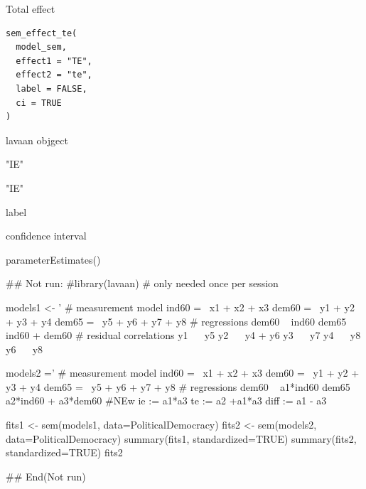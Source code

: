 \documentclass[a4paper]{book}
\begin{document}
%
\begin{Description}
Total effect
\end{Description}
%
\begin{Usage}
\begin{verbatim}
sem_effect_te(
  model_sem,
  effect1 = "TE",
  effect2 = "te",
  label = FALSE,
  ci = TRUE
)
\end{verbatim}
\end{Usage}
%
\begin{Arguments}
\begin{ldescription}
\item[\code{model\_sem}] lavaan objgect

\item[\code{effect1}] "IE"

\item[\code{effect2}] "IE"

\item[\code{label}] label

\item[\code{ci}] confidence interval
\end{ldescription}
\end{Arguments}
%
\begin{Value}
parameterEstimates()
\end{Value}
%
\begin{Examples}
\begin{ExampleCode}

\#\# Not run: 
#library(lavaan) # only needed once per session

models1 <- '
  # measurement model
    ind60 =~ x1 + x2 + x3
    dem60 =~ y1 + y2 + y3 + y4
    dem65 =~ y5 + y6 + y7 + y8
    # regressions
    dem60 ~ ind60
    dem65 ~ ind60 + dem60
      # residual correlations
    y1 ~~ y5
    y2 ~~ y4 + y6
    y3 ~~ y7
    y4 ~~ y8
    y6 ~~ y8

models2 ='
  # measurement model
    ind60 =~ x1 + x2 + x3
    dem60 =~ y1 + y2 + y3 + y4
    dem65 =~ y5 + y6 + y7 + y8
     # regressions
    dem60 ~ a1*ind60
    dem65 ~ a2*ind60 + a3*dem60
 #NEw
   ie := a1*a3
   te := a2 +a1*a3
   diff := a1 - a3




fits1 <- sem(models1, data=PoliticalDemocracy)
fits2 <- sem(models2, data=PoliticalDemocracy)
summary(fits1, standardized=TRUE)
summary(fits2, standardized=TRUE)
fits2 %

## End(Not run)

\end{ExampleCode}
\end{Examples}
\end{document}
